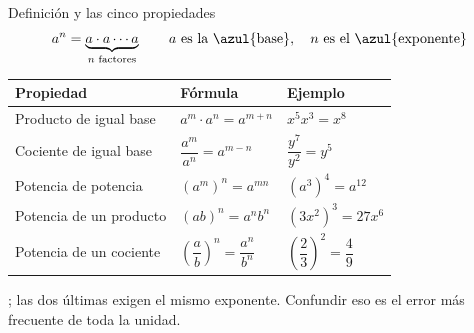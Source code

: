 \documentclass[aspectratio=169,10pt]{beamer}
\begin{document}

\begin{frame}{Definición y las cinco propiedades}
  \scriptsize
  \[ a^{n} = \underbrace{a\cdot a\cdots a}_{n \text{ factores}}
     \qquad a \text{ es la \azul{base}},\quad n \text{ es el \azul{exponente}} \]

  \vspace{0.05cm}
  \begin{center}
  \begin{tabular}{@{}p{4.0cm}p{3.4cm}p{4.4cm}@{}}
    \toprule
    \textbf{Propiedad} & \textbf{Fórmula} & \textbf{Ejemplo} \\
    \midrule
    Producto de igual base & $a^{m}\cdot a^{n} = a^{m+n}$ &
      $x^{5}x^{3} = x^{8}$ \\
    Cociente de igual base & $\dfrac{a^{m}}{a^{n}} = a^{m-n}$ &
      $\dfrac{y^{7}}{y^{2}} = y^{5}$ \\
    Potencia de potencia & $(a^{m})^{n} = a^{mn}$ &
      $(a^{3})^{4} = a^{12}$ \\
    Potencia de un producto & $(ab)^{n} = a^{n}b^{n}$ &
      $(3x^{2})^{3} = 27x^{6}$ \\
    Potencia de un cociente & $\left(\dfrac{a}{b}\right)^{n}
      = \dfrac{a^{n}}{b^{n}}$ & $\left(\dfrac{2}{3}\right)^{2}
      = \dfrac{4}{9}$ \\
    \bottomrule
  \end{tabular}
  \end{center}

  \vspace{0.05cm}
  {\tiny\color{uniGris} ; las
  dos últimas exigen el mismo exponente. Confundir eso es el error más
  frecuente de toda la unidad.}
\end{frame}
\end{document}
